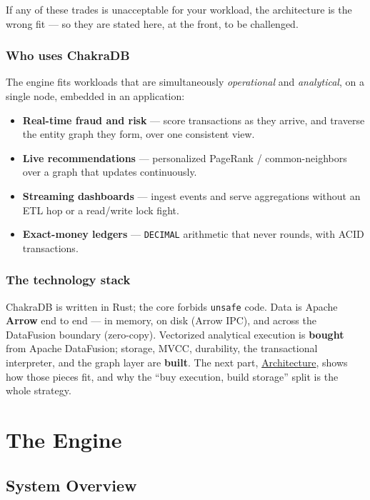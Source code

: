 \documentclass[
  11pt,
  openany]{book}
\providecommand{\tightlist}{%
  \setlength{\itemsep}{0pt}\setlength{\parskip}{0pt}}
\begin{document}
If any of these trades is unacceptable for your workload, the
architecture is the wrong fit --- so they are stated here, at the front,
to be challenged.

\section{Who uses ChakraDB}\label{who-uses-chakradb}

The engine fits workloads that are simultaneously \emph{operational} and
\emph{analytical}, on a single node, embedded in an application:

\begin{itemize}
\tightlist
\item
  \textbf{Real-time fraud and risk} --- score transactions as they
  arrive, and traverse the entity graph they form, over one consistent
  view.
\item
  \textbf{Live recommendations} --- personalized PageRank /
  common-neighbors over a graph that updates continuously.
\item
  \textbf{Streaming dashboards} --- ingest events and serve aggregations
  without an ETL hop or a read/write lock fight.
\item
  \textbf{Exact-money ledgers} --- \texttt{DECIMAL} arithmetic that
  never rounds, with ACID transactions.
\end{itemize}

\section{The technology stack}\label{the-technology-stack}

ChakraDB is written in Rust; the core forbids \texttt{unsafe} code. Data
is Apache \textbf{Arrow} end to end --- in memory, on disk (Arrow IPC),
and across the DataFusion boundary (zero-copy). Vectorized analytical
execution is \textbf{bought} from Apache DataFusion; storage, MVCC,
durability, the transactional interpreter, and the graph layer are
\textbf{built}. The next part,
\href{../engine/overview.md}{Architecture}, shows how those pieces fit,
and why the ``buy execution, build storage'' split is the whole
strategy.

\part{The Engine}

\chapter{System Overview}\label{system-overview}
\end{document}
